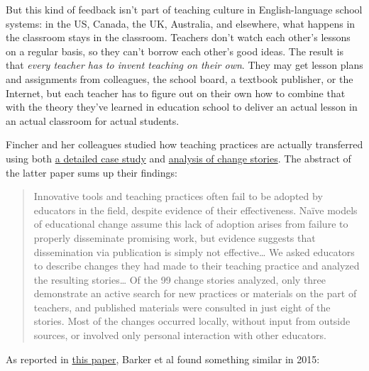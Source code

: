 But this kind of feedback isn't part of teaching culture in
English-language school systems: in the US, Canada, the UK, Australia,
and elsewhere, what happens in the classroom stays in the classroom.
Teachers don't watch each other's lessons on a regular basis, so they
can't borrow each other's good ideas. The result is that \emph{every
teacher has to invent teaching on their own}. They may get lesson plans
and assignments from colleagues, the school board, a textbook publisher,
or the Internet, but each teacher has to figure out on their own how to
combine that with the theory they've learned in education school to
deliver an actual lesson in an actual classroom for actual students.

Fincher and her colleagues studied how teaching practices are actually
transferred using both
\href{\{\{\%20page.root\%20\}\}/files/papers/fincher-warrens-questions-2007.pdf}{a
detailed case study} and
\href{\{\{\%20page.root\%20\}\}/files/papers/fincher-stories-change-2012.pdf}{analysis
of change stories}. The abstract of the latter paper sums up their
findings:

\begin{quote}
Innovative tools and teaching practices often fail to be adopted by
educators in the field, despite evidence of their effectiveness. Naïve
models of educational change assume this lack of adoption arises from
failure to properly disseminate promising work, but evidence suggests
that dissemination via publication is simply not effective\ldots{} We
asked educators to describe changes they had made to their teaching
practice and analyzed the resulting stories\ldots{} Of the 99 change
stories analyzed, only three demonstrate an active search for new
practices or materials on the part of teachers, and published materials
were consulted in just eight of the stories. Most of the changes
occurred locally, without input from outside sources, or involved only
personal interaction with other educators.
\end{quote}

As reported in
\href{\{\{\%20page.root\%20\}\}/files/papers/barker-practice-adoption-2015.pdf}{this
paper}, Barker et al found something similar in 2015:

